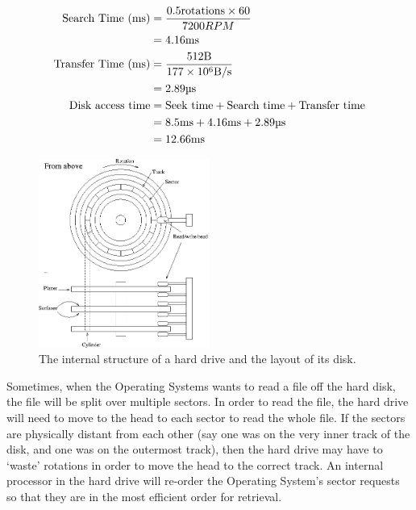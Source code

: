 
\[
  \begin{split}
    \text{Search Time (\si{\milli\second})} &= \frac{0.5\text{rotations} \times 60}{7200RPM}\\
                                            &= 4.16\si{\milli\second}\\
    \text{Transfer Time (\si{\milli\second})} &= \frac{512\si{\byte}}{177\times10^6\si{\byte\per\second}}\\
                                              &= 2.89\si{\micro\second}\\
    \text{Disk access time} &= \text{Seek time} + \text{Search time}
                                + \text{Transfer time}\\
                            &= 8.5\si{\milli\second} + 4.16\si{\milli\second} + 2.89\si{\micro\second}\\
                            &= 12.66\si{\milli\second}
  \end{split}
\]

\begin{figure}
  \centering
  \includegraphics[width=0.5\textwidth]{images/hd-schematic}
  \caption{The internal structure of a hard drive and the layout of its disk.}
  \label{hd-config}
\end{figure}


Sometimes, when the Operating Systems wants to read a file off the hard disk,
the file will be split over multiple sectors. In order to read the file, the
hard drive will need to move to the head to each sector to read the whole file.
If the sectors are physically distant from each other (say one was on the very
inner track of the disk, and one was on the outermost track), then the hard
drive may have to `waste' rotations in order to move the head to the correct
track. An internal processor in the hard drive will re-order the Operating
System's sector requests so that they are in the most efficient order for
retrieval.

